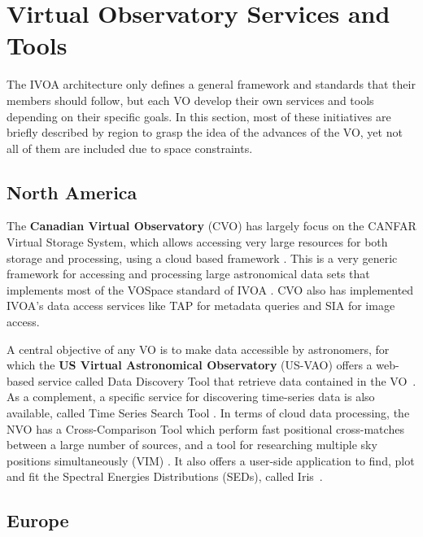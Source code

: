 \section{Virtual Observatory Services and Tools}

The IVOA architecture only defines a general framework and
standards that their members should follow, but each VO develop
their own services and tools depending on their specific goals.
In this section, most of these initiatives are briefly
described by region to grasp the idea of the advances of
the VO, yet not all of them are included due to space 
constraints.

\subsection{North America}

The \textbf{Canadian Virtual Observatory} (CVO) has largely focus on the CANFAR Virtual Storage
System, which
allows accessing very large resources for both storage and processing, 
using a cloud based framework \cite{Gaudet2011}. 
This is a very generic framework for accessing and processing 
large astronomical data sets that implements most of the
VOSpace standard of IVOA \cite{Graham2007}. CVO also has implemented
IVOA's data access services like TAP for metadata queries 
and SIA for image access.

A central objective of any VO is to make data accessible by astronomers,
for which the \textbf{US Virtual Astronomical Observatory} (US-VAO) 
offers a web-based service called Data Discovery Tool 
that retrieve data contained in the VO~\cite{McGlynn2013}. 
As a complement, a specific service for discovering time-series data
is also available, called Time Series Search Tool \cite{Graham2012}.
In terms of cloud data processing, the NVO has a Cross-Comparison Tool 
which perform fast positional cross-matches between a large number of 
sources, and a tool for researching multiple sky positions simultaneously (VIM)
\cite{Hanisch2012}.
It also offers a user-side application to find, plot and fit the
Spectral Energies Distributions (SEDs), called Iris~\cite{Laurino2013}.

\subsection{Europe}

